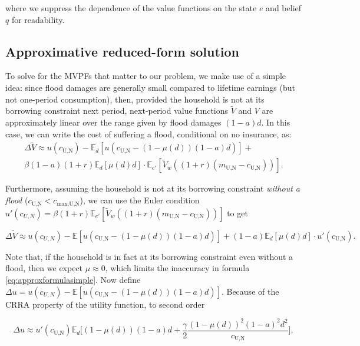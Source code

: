 \documentclass[12pt]{article}
\begin{document}
where we suppress the dependence of the value functions on the state $e$ and belief $q$ for readability.  

\subsection{Approximative reduced-form solution}

To solve for the MVPFs that matter to our problem, we make use of a simple idea: since flood damages are generally small compared to lifetime earnings (but not one-period consumption), then, provided the household is not at its borrowing constraint next period, next-period value functions $\tilde{V}$ and $V$ are approximately linear over the range given by flood damages $(1-a)d$. In this case, we can write the cost of suffering a flood, conditional on no insurance, as:
\begin{align}\label{eq:approxformula}
\Delta \tilde{V} \approx u(c_{\text{U,N}})-\mathbb{E}_d[u(c_{\text{U,N}}-(1-\mu(d))(1-a)d)]+ \nonumber \\ \beta(1-a)(1+r)\mathbb{E}_d[\mu(d)d]\cdot\mathbb{E}_{e'}[\tilde{V}_w((1+r)(m_\text{U,N}-c_\text{U,N}))].
\end{align}

Furthermore, assuming the household is not at its borrowing constraint \textit{without a flood} ($c_{\text{U,N}}<c_{\text{max,U,N}}$), we can use the Euler condition $u'(c_{U,N})=\beta(1+r)\mathbb{E}_{e'}[\tilde{V}_w((1+r)(m_\text{U,N}-c_\text{U,N}))]$ to get 

\begin{equation}\label{eq:approxformulasimple}
\Delta \tilde{V} \approx u(c_{U,N})-\mathbb{E}[u(c_{\text{U,N}}-(1-\mu(d))(1-a)d)]+(1-a)\mathbb{E}_d[\mu(d)d]\cdot u'(c_{\text{U,N}}).
\end{equation}

Note that, if the household is in fact at its borrowing constraint even without a flood, then we expect $\mu\approx0$, which limits the inaccuracy in formula \eqref{eq:approxformulasimple}. Now define $\Delta u=u(c_{U,N})-\mathbb{E}[u(c_{\text{U,N}}-(1-\mu(d))(1-a)d)]$. Because of the CRRA property of the utility function, to second order

\begin{equation}\label{eq:simplesecondorderapprox}
 \Delta u\approx u'(c_{\text{U,N}})\mathbb{E}_d\big[(1-\mu(d))(1-a)d+\frac{\gamma}{2}\frac{(1-\mu(d))^2(1-a)^2d^2}{c_{\text{U,N}}}\big],
\end{equation}
\end{document}
